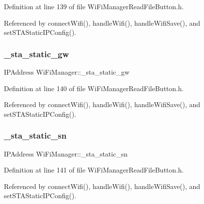Definition at line 139 of file Wi\+Fi\+Manager\+Read\+File\+Button.\+h.



Referenced by connect\+Wifi(), handle\+Wifi(), handle\+Wifi\+Save(), and set\+S\+T\+A\+Static\+I\+P\+Config().

\mbox{\label{class_wi_fi_manager_a36648ca4819dc0feedaf9e1987d56d96}} 
\subsubsection{\texorpdfstring{\+\_\+sta\+\_\+static\+\_\+gw}{\_sta\_static\_gw}}
{\footnotesize\ttfamily I\+P\+Address Wi\+Fi\+Manager\+::\+\_\+sta\+\_\+static\+\_\+gw\hspace{0.3cm}{\ttfamily [private]}}



Definition at line 140 of file Wi\+Fi\+Manager\+Read\+File\+Button.\+h.



Referenced by connect\+Wifi(), handle\+Wifi(), handle\+Wifi\+Save(), and set\+S\+T\+A\+Static\+I\+P\+Config().

\mbox{\label{class_wi_fi_manager_a3fd337255bce688189f9d450cc0ca3a3}} 
\subsubsection{\texorpdfstring{\+\_\+sta\+\_\+static\+\_\+sn}{\_sta\_static\_sn}}
{\footnotesize\ttfamily I\+P\+Address Wi\+Fi\+Manager\+::\+\_\+sta\+\_\+static\+\_\+sn\hspace{0.3cm}{\ttfamily [private]}}



Definition at line 141 of file Wi\+Fi\+Manager\+Read\+File\+Button.\+h.



Referenced by connect\+Wifi(), handle\+Wifi(), handle\+Wifi\+Save(), and set\+S\+T\+A\+Static\+I\+P\+Config().

\mbox{\label{class_wi_fi_manager_a22e803d23ae77cb611914445db17c9b6}} 
